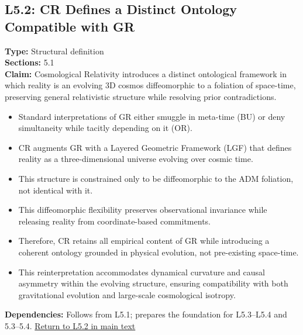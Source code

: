 \documentclass[12pt]{book}
\newcommand{\returnlink}[1]{\hyperref[logic:#1]{Return to #1 in main text}\xspace}
\begin{document}
\subsection*{L5.2: CR Defines a Distinct Ontology Compatible with GR}
\label{appendix:L5.2}
\textbf{Type:} Structural definition \\
\textbf{Sections:} 5.1 \\
\textbf{Claim:} Cosmological Relativity introduces a distinct ontological framework in which reality is an evolving 3D cosmos diffeomorphic to a foliation of space-time, preserving general relativistic structure while resolving prior contradictions.
\begin{itemize}
  \item Standard interpretations of GR either smuggle in meta-time (BU) or deny simultaneity while tacitly depending on it (OR).
  \item CR augments GR with a Layered Geometric Framework (LGF) that defines reality as a three-dimensional universe evolving over cosmic time.
  \item This structure is constrained only to be diffeomorphic to the ADM foliation, not identical with it.
  \item This diffeomorphic flexibility preserves observational invariance while releasing reality from coordinate-based commitments.
  \item Therefore, CR retains all empirical content of GR while introducing a coherent ontology grounded in physical evolution, not pre-existing space-time.
  \item This reinterpretation accommodates dynamical curvature and causal asymmetry within the evolving structure, ensuring compatibility with both gravitational evolution and large-scale cosmological isotropy.
\end{itemize}
\textbf{Dependencies:} Follows from L5.1; prepares the foundation for L5.3–L5.4 and 5.3–5.4.
\returnlink{L5.2}
\end{document}
